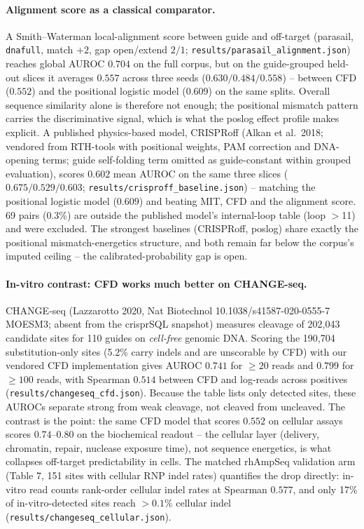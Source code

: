 \documentclass[12pt]{article}
\begin{document}
\paragraph{Alignment score as a classical comparator.} A
Smith--Waterman local-alignment score between guide and off-target
(parasail, \texttt{dnafull}, match $+2$, gap open/extend $2/1$;
\texttt{results/parasail\_alignment.json}) reaches global AUROC
$0.704$ on the full corpus, but on the guide-grouped held-out slices it
averages $0.557$ across three seeds ($0.630/0.484/0.558$) -- between
CFD ($0.552$) and the positional logistic model ($0.609$) on the same
splits. Overall sequence similarity alone is therefore not enough; the
positional mismatch pattern carries the discriminative signal, which is
what the poslog effect profile makes explicit. A published physics-based
model, CRISPRoff (Alkan et al.\ 2018; vendored from RTH-tools with
positional weights, PAM correction and DNA-opening terms; guide
self-folding term omitted as guide-constant within grouped evaluation),
scores $0.602$ mean AUROC on the same three slices
($0.675/0.529/0.603$; \texttt{results/crisproff\_baseline.json}) --
matching the positional logistic model ($0.609$) and beating MIT, CFD
and the alignment score. 69 pairs (0.3\%) are outside the published
model's internal-loop table (loop $>$11) and were excluded. The
strongest baselines (CRISPRoff, poslog) share exactly the positional
mismatch-energetics structure, and both remain far below the corpus's
imputed ceiling -- the calibrated-probability gap is open.
\paragraph{In-vitro contrast: CFD works much better on CHANGE-seq.}
CHANGE-seq (Lazzarotto 2020, Nat Biotechnol 10.1038/s41587-020-0555-7
MOESM3; absent from the crisprSQL snapshot) measures cleavage of
202{,}043 candidate sites for 110 guides on \emph{cell-free} genomic
DNA. Scoring the 190{,}704 substitution-only sites (5.2\% carry indels
and are unscorable by CFD) with our vendored CFD implementation gives
AUROC $0.741$ for $\geq 20$ reads and $0.799$ for $\geq 100$ reads,
with Spearman $0.514$ between CFD and log-reads across positives
(\texttt{results/changeseq\_cfd.json}). Because the table lists only
detected sites, these AUROCs separate strong from weak cleavage, not
cleaved from uncleaved. The contrast is the point: the same CFD model
that scores $0.552$ on cellular assays scores $0.74$--$0.80$ on the
biochemical readout -- the cellular layer (delivery, chromatin, repair,
nuclease exposure time), not sequence energetics, is what collapses
off-target predictability in cells. The matched rhAmpSeq
validation arm (Table 7, 151 sites with cellular RNP indel rates)
quantifies the drop directly: in-vitro read counts rank-order cellular
indel rates at Spearman $0.577$, and only 17\% of in-vitro-detected
sites reach $>0.1\%$ cellular indel
(\texttt{results/changeseq\_cellular.json}).
\end{document}
